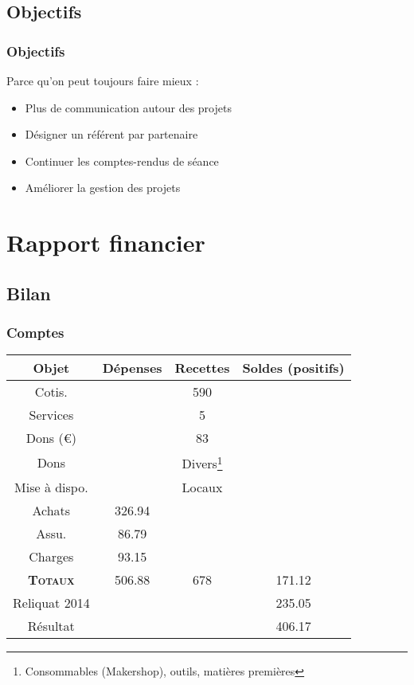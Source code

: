\documentclass[10pt, compress]{beamer}
\begin{document}
\subsection{Objectifs}
\begin{frame}
	\frametitle{Objectifs}

	Parce qu'on peut toujours faire mieux :

	\begin{itemize}
		\item Plus de \alert{communication} autour des projets
		\item Désigner un \alert{référent} par partenaire
		\item Continuer les \alert{comptes-rendus} de séance
		\item Améliorer la \alert{gestion des projets}
	\end{itemize}

\end{frame}


\section{Rapport financier}

\subsection{Bilan}

\begin{frame}
	\frametitle{Comptes}
	\centering
	\begin{tabular}{cccc}\toprule
		Objet & Dépenses & Recettes & Soldes (positifs)\\\midrule
		Cotis. & & 590 & \\
		Services & & 5 & \\
		Dons (\euro) & & 83 & \\
		Dons & & Divers\footnote{Consommables (Makershop), outils, matières premières}  & \\
		Mise à dispo. & & Locaux & \\\midrule
		Achats & 326.94 & & \\
		Assu. & 86.79 & & \\
		Charges & 93.15 & & \\\midrule
		\textsc{\textbf{Totaux}} & 506.88 & 678 & 171.12\\\midrule
		Reliquat 2014 & & & 235.05\\
		Résultat & & & 406.17\\
		\bottomrule
	\end{tabular}
\end{frame}
\end{document}
